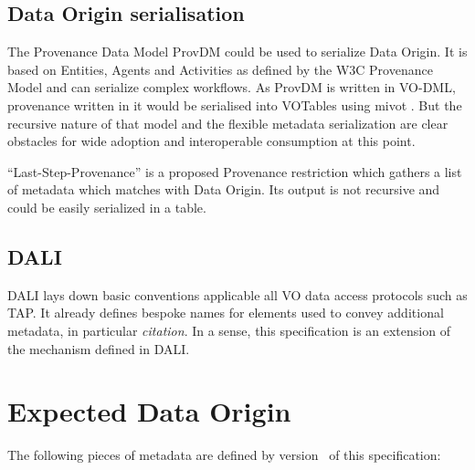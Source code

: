 \documentclass[11pt,a4paper]{ivoa}
\begin{document}
\subsection{Data Origin serialisation}
The Provenance Data Model ProvDM \citep{2020ivoa.spec.0411S} could be used to serialize Data Origin.
It is based on Entities, Agents and Activities as defined by the W3C Provenance Model and can serialize complex workflows.  As ProvDM is written in VO-DML, provenance written in it would be serialised into VOTables using  mivot .  But the recursive nature of that model and the flexible metadata serialization are clear obstacles for wide adoption and interoperable consumption at this point.

``Last-Step-Provenance'' is a proposed Provenance restriction which gathers a list of metadata which matches with Data Origin. Its output is not recursive and could be easily serialized in a table.

\subsection{DALI}
DALI \citep{2017ivoa.spec.0517D} lays down basic conventions applicable all VO data access protocols such as TAP.
It already defines bespoke names for  elements used to convey additional metadata, in particular \emph{citation}.  In a sense, this specification is an extension of the mechanism defined in DALI.

\section{Expected Data Origin}
\label{sect:expecteddataorigin}

The following pieces of metadata are defined by version \ivoaDocversion~of this
specification:
\end{document}
